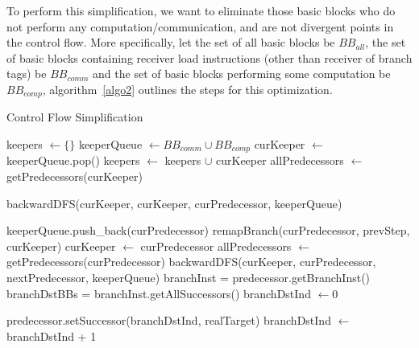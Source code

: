 To perform this simplification, we want to eliminate those basic blocks who do not
perform any computation/communication, and are not divergent points in the control flow.
More specifically, let the set of all basic blocks be $BB_{all}$, the set of basic blocks containing receiver load instructions (other than receiver of branch tags) be $BB_{comm}$ and the set of basic blocks performing some computation
be $BB_{comp}$, algorithm~\ref{algo2} outlines the steps for this optimization.
\begin{algorithm}[t]
  \caption{Control Flow Simplification}\label{algo2}
  \begin{algorithmic}[1]
    \State keepers $\gets \{\} $
    \State keeperQueue $\gets BB_{comm} \cup BB_{comp}$
     \State curKeeper $\gets$ keeperQueue.pop()
     \State keepers $\gets$ keepers $\cup$ curKeeper
     \State allPredecessors $\gets$ getPredecessors(curKeeper)
     
     \State backwardDFS(curKeeper, curKeeper, curPredecessor, keeperQueue)
     \EndFor
  \EndWhile
  
  \EndProcedure

  \Return
  \EndIf
  \State keeperQueue.push\_back(curPredecessor)
  \State remapBranch(curPredecessor, prevStep, curKeeper)
  \State curKeeper $\gets$ curPredecessor
  \EndIf
  \State allPredecessors $\gets$ getPredecessors(curPredecessor)
     \State backwardDFS(curKeeper, curPredecessor, nextPredecessor, keeperQueue)
     \EndFor 
  \EndProcedure
  \State branchInst = predecessor.getBranchInst()
  \State branchDstBBs = branchInst.getAllSuccessors()
  \State branchDstInd $\gets 0$
     
     \State predecessor.setSuccessor(branchDstInd, realTarget) 
     \EndIf
     \State branchDstInd $\gets$ branchDstInd + 1
     \EndFor 
  \EndProcedure
  \end{algorithmic}
\end{algorithm}

